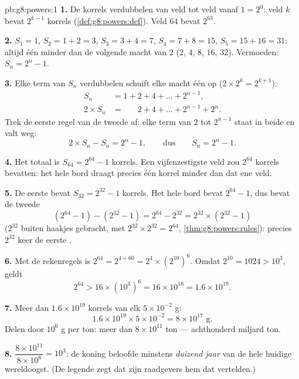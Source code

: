 \begin{solution}{pb:g8:powers:1}
\textbf{1.} De korrels verdubbelen van veld tot veld vanaf $1 = 2^0$: veld $k$ bevat
$2^{k-1}$ korrels (\cref{def:g8:powers:def}). Veld $64$ bevat $2^{63}$.

\textbf{2.} $S_1 = 1$, $S_2 = 1 + 2 = 3$, $S_3 = 3 + 4 = 7$, $S_4 = 7 + 8 = 15$,
$S_5 = 15 + 16 = 31$: altijd één minder dan de volgende macht van $2$ ($2$, $4$, $8$,
$16$, $32$). Vermoeden: $S_n = 2^n - 1$.

\textbf{3.} Elke term van $S_n$ verdubbelen schuift elke macht één op
($2 \times 2^{k} = 2^{k+1}$):
\begin{align*}
S_n &= 1 + 2 + 4 + \dots + 2^{n-1}, \\
2 \times S_n &= \phantom{1 + {}} 2 + 4 + \dots + 2^{n-1} + 2^n .
\end{align*}
Trek de eerste regel van de tweede af: elke term van $2$ tot $2^{n-1}$ staat in beide en
valt weg:
\[
2 \times S_n - S_n = 2^n - 1,
\qquad\text{dus}\qquad
S_n = 2^n - 1 .
\]

\textbf{4.} Het totaal is $S_{64} = 2^{64} - 1$ korrels. Een vijfenzestigste veld zou
$2^{64}$ korrels bevatten: het hele bord draagt precies één korrel minder dan dat ene
veld.

\textbf{5.} De eerste  bevat $S_{32} = 2^{32} - 1$ korrels. Het hele bord bevat
$2^{64} - 1$, dus bevat de tweede 
\[
\left(2^{64} - 1\right) - \left(2^{32} - 1\right)
= 2^{64} - 2^{32}
= 2^{32} \times \left(2^{32} - 1\right)
\]
($2^{32}$ buiten haakjes gebracht, met $2^{32} \times 2^{32} = 2^{64}$,
\cref{thm:g8:powers:rules}): precies $2^{32}$ keer de eerste .

\textbf{6.} Met de rekenregels is $2^{64} = 2^{4 + 60} = 2^4 \times
\left(2^{10}\right)^6$. Omdat $2^{10} = 1024 > 10^3$, geldt
\[
2^{64} > 16 \times \left(10^3\right)^6 = 16 \times 10^{18}
= 1.6 \times 10^{19} .
\]

\textbf{7.} Meer dan $1.6 \times 10^{19}$ korrels van elk $5 \times 10^{-2}$ g:
\[
1.6 \times 10^{19} \times 5 \times 10^{-2}
= 8 \times 10^{17} \text{ g} .
\]
Delen door $10^6$ g per ton: meer dan $8 \times 10^{11}$ ton --- achthonderd miljard
ton.

\textbf{8.} $\dfrac{8 \times 10^{11}}{8 \times 10^{8}} = 10^3$: de koning beloofde
minstens \emph{duizend jaar} van de hele huidige wereldoogst. (De legende zegt dat zijn
raadgevers hem dat vertelden.)


\end{solution}
